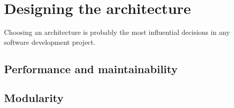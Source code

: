\section{Designing the architecture}
Choosing an architecture is probably the most influential decisions in any software development project. 
\subsection{Performance and maintainability}
\subsection{Modularity}